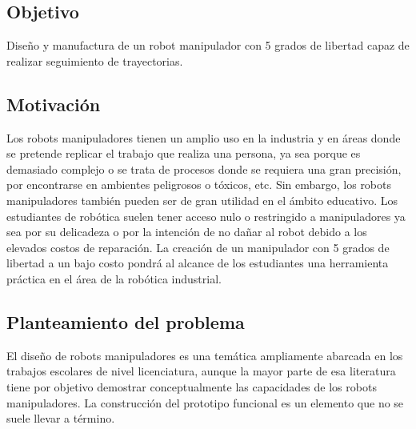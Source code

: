 
\subsection{Objetivo}

Diseño y manufactura de un robot manipulador con 5 grados de libertad capaz de realizar seguimiento de trayectorias.
\subsection{Motivación}

Los robots manipuladores tienen un amplio uso en la industria y en áreas donde se pretende replicar el trabajo que realiza una persona, ya sea porque es demasiado complejo o se trata de procesos donde se requiera una gran precisión, por encontrarse en ambientes peligrosos o tóxicos, etc. Sin embargo, los robots manipuladores también pueden ser de gran utilidad en el ámbito educativo. Los estudiantes de robótica suelen tener acceso nulo o restringido a manipuladores ya sea por su delicadeza o por la intención de no dañar al robot debido a los elevados costos de reparación. La creación de un manipulador con 5 grados de libertad a un bajo costo pondrá al alcance de los estudiantes una herramienta práctica en el área de la robótica industrial.

\subsection{Planteamiento del problema}

El diseño de robots manipuladores es una temática ampliamente abarcada en los trabajos escolares de nivel licenciatura, aunque la mayor parte de esa literatura tiene por objetivo demostrar conceptualmente las capacidades de los robots manipuladores. La construcción del prototipo funcional es un elemento que no se suele llevar a término.
